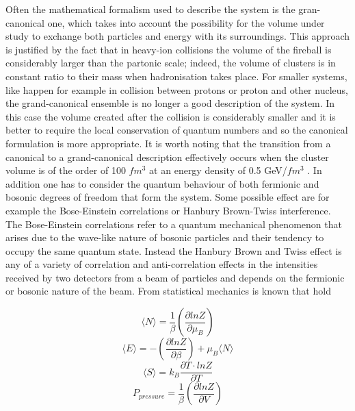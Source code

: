 \documentclass[12pt,a4paper]{book}
\begin{document}
	Often the mathematical formalism used to describe the system is the gran-canonical one, which takes into account the possibility for the volume under study to exchange both particles and energy with its surroundings. This approach is justified by the fact that in heavy-ion collisions the volume of the fireball is considerably larger than the partonic scale; indeed, the volume of clusters is in constant ratio to their mass when hadronisation takes place. For smaller systems, like happen for example in collision between protons or proton and other nucleus, the grand-canonical ensemble is no longer a good description of the system. In this case the volume created after the collision is considerably smaller and it is better to require the local conservation of quantum numbers and so the canonical formulation is more appropriate. It is worth noting that the transition from a canonical to a grand-canonical description effectively occurs when the cluster volume is of the order of 100 $fm^3$ at an energy density of 0.5 GeV/$fm^3$ \cite{PhysRevC.65.044901}. 
	In addition one has to consider the quantum behaviour of both fermionic and bosonic degrees of freedom that form the system. Some possible effect are for example the Bose-Einstein correlations or Hanbury Brown-Twiss interference. The Bose-Einstein correlations refer to a quantum mechanical phenomenon that arises due to the wave-like nature of bosonic particles and their tendency to occupy the same quantum state. Instead the Hanbury Brown and Twiss effect is any of a variety of correlation and anti-correlation effects in the intensities received by two detectors from a beam of particles and depends on the fermionic or bosonic nature of the beam. From statistical mechanics is known that hold
	
	\begin{equation}
		\langle N \rangle = \frac{1}{\beta} \left( \frac{\partial lnZ}{\partial \mu_B}\right)
		\label{eq:stat_n}
	\end{equation}
	\begin{equation}
		\langle E \rangle = - \left( \frac{\partial lnZ}{\partial \beta}\right) + \mu_B \langle N \rangle 
		\label{eq:stat_energy}
	\end{equation}
	\begin{equation}
		\langle S \rangle = k_B \frac{\partial T \cdot lnZ}{\partial T}
		\label{eq:stat_entropy}
	\end{equation}
	\begin{equation}
		P_{pressure} = \frac{1}{\beta} \left( \frac{\partial lnZ}{\partial V}\right) 
		\label{eq:stat_pressure}
	\end{equation}
	
\end{document}
